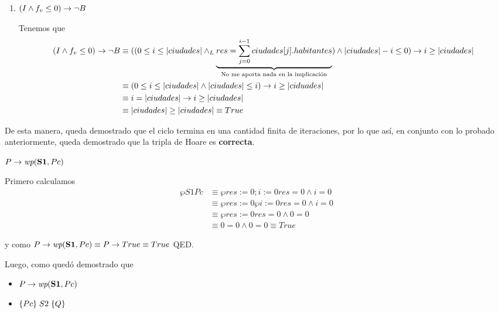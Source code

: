 \documentclass[10pt,a4paper]{article}
\begin{document}
\begin{enumerate}
	\item $(I \land f_v \leq 0) \rightarrow \neg B$

	      Tenemos que
	      \begin{align*}
		      (I \land f_v \leq 0) \rightarrow \neg B & \equiv ((0 \leq i \leq |ciudades| \land _L \underbrace{res = \sum_{j = 0}^{i - 1} ciudades[j].habitantes}_{\text{No me aporta nada en la implicación}}) \land |ciudades| - i \leq 0) \rightarrow i \geq |ciudades| \\
		                                        & \equiv (0 \leq i \leq |ciudades| \land |ciudades| \leq i) \rightarrow i \geq |ciduades|                                                                                                                           \\
		                                        & \equiv i = |ciudades| \rightarrow i \geq |ciudades|                                                                                                                                                               \\
		                                        & \equiv |ciudades| \geq |ciudades| \equiv True
	      \end{align*}
\end{enumerate}

De esta manera, queda demostrado que el ciclo termina en una cantidad finita de iteraciones, por lo que así, en conjunto con lo probado anteriormente, queda demostrado que la tripla de Hoare  es \textbf{correcta}.
\bigskip

{\large$P \Then \wp{S1}{Pc}$}
\medskip

Primero calculamos 
%
\begin{align*}
	\wp{S1}{Pc} & \equiv \wp{res := 0; i := 0}{res = 0 \land i = 0}      \\
	            & \equiv \wp{res := 0}{\wp{i := 0}{res = 0 \land i = 0}} \\
	            & \equiv \wp{res := 0}{res = 0 \land 0 = 0}              \\
	            & \equiv 0 = 0 \land 0 = 0 \equiv True
\end{align*}

y como $P \Then \wp{S1}{Pc} \equiv P \Then True \equiv True$ QED.
\bigskip

Luego, como quedó demostrado que

\begin{itemize}
	\item $P \Then \wp{S1}{Pc}$
	\item $\{Pc\} \; S2 \; \{Q\}$
\end{itemize}
\end{document}
